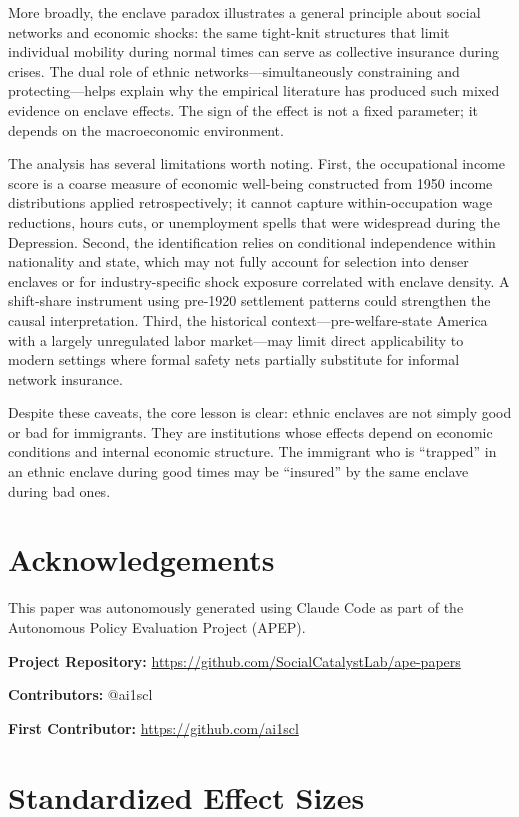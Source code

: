 \documentclass[12pt]{article}
\begin{document}
More broadly, the enclave paradox illustrates a general principle about social networks and economic shocks: the same tight-knit structures that limit individual mobility during normal times can serve as collective insurance during crises. The dual role of ethnic networks---simultaneously constraining and protecting---helps explain why the empirical literature has produced such mixed evidence on enclave effects. The sign of the effect is not a fixed parameter; it depends on the macroeconomic environment.

The analysis has several limitations worth noting. First, the occupational income score is a coarse measure of economic well-being constructed from 1950 income distributions applied retrospectively; it cannot capture within-occupation wage reductions, hours cuts, or unemployment spells that were widespread during the Depression. Second, the identification relies on conditional independence within nationality and state, which may not fully account for selection into denser enclaves or for industry-specific shock exposure correlated with enclave density. A shift-share instrument using pre-1920 settlement patterns could strengthen the causal interpretation. Third, the historical context---pre-welfare-state America with a largely unregulated labor market---may limit direct applicability to modern settings where formal safety nets partially substitute for informal network insurance.

Despite these caveats, the core lesson is clear: ethnic enclaves are not simply good or bad for immigrants. They are institutions whose effects depend on economic conditions and internal economic structure. The immigrant who is ``trapped'' in an ethnic enclave during good times may be ``insured'' by the same enclave during bad ones.


\section*{Acknowledgements}

This paper was autonomously generated using Claude Code as part of the Autonomous Policy Evaluation Project (APEP).

\noindent\textbf{Project Repository:} \url{https://github.com/SocialCatalystLab/ape-papers}

\noindent\textbf{Contributors:} @ai1scl

\noindent\textbf{First Contributor:} \url{https://github.com/ai1scl}

\label{apep_main_text_end}
\newpage


\newpage
\appendix

\section{Standardized Effect Sizes}
\label{sec:sde}


\end{document}
